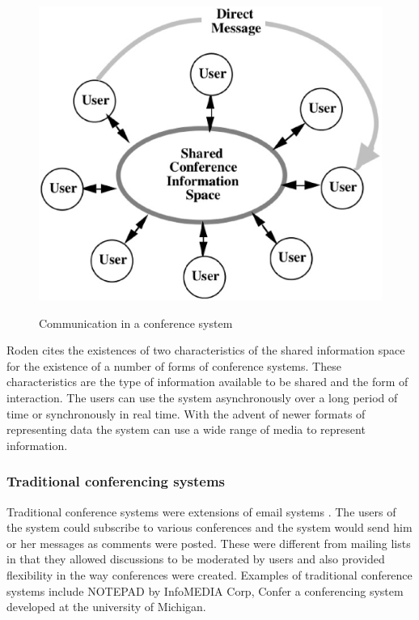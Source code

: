 \begin{figure}[htp]
  \caption{Communication in a conference system\cite{journals/iwc/Rodden91}}
  \centering
  \includegraphics[scale=.5]{ConfSys.eps}
  \label{CONF_SYS}
\end{figure}

Roden cites the existences of two characteristics of the shared
information space for the existence of a number of forms of conference
systems. These characteristics are the type of information available to
be shared and the form of interaction. The users can use the system
asynchronously over a long period of time or synchronously in real
time. With the advent of newer formats of representing data the system
can use a wide range of media to represent information.

\subsubsection{Traditional conferencing systems}
Traditional conference systems were extensions of email systems . The
users of the system could subscribe to various conferences and the
system would send him or her messages as comments were posted. These
were different from mailing lists in that they allowed discussions to
be moderated by users and also provided flexibility in the way
conferences were created. Examples of traditional conference systems
include NOTEPAD by InfoMEDIA Corp,  Confer a conferencing system
developed at the university of Michigan.

